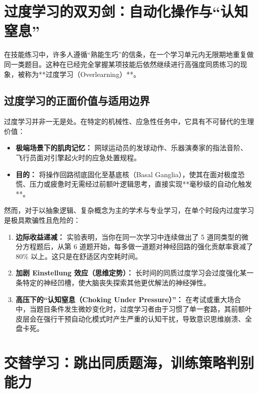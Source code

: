 \documentclass[12pt,a4paper,openany]{ctexbook}
\begin{document}
\section{过度学习的双刃剑：自动化操作与“认知窒息”}

在技能练习中，许多人遵循“熟能生巧”的信条，在一个学习单元内无限期地重复做同一类题目。这种在已经完全掌握某项技能后依然继续进行高强度同质练习的现象，被称为**过度学习（Overlearning）**。

\subsection*{过度学习的正面价值与适用边界}

过度学习并非一无是处。在特定的机械性、应急性任务中，它具有不可替代的生理价值：
\begin{itemize}
    \item \textbf{极端场景下的肌肉记忆：} 网球运动员的发球动作、乐器演奏家的指法音阶、飞行员面对引擎起火时的应急处置规程。
    \item \textbf{目的：} 将操作回路彻底固化至基底核（Basal Ganglia），使其在面对极度恐慌、压力或疲惫时无需经过前额叶逻辑思考，直接实现**毫秒级的自动化触发**。
\end{itemize}

\begin{warningbox}
然而，对于以抽象逻辑、复杂概念为主的学术与专业学习，在单个时段内过度学习是极具欺骗性且危险的：
\begin{enumerate}
    \item \textbf{边际收益递减：} 实验表明，当你在同一次学习中连续做出了 5 道同类型的微分方程题后，从第 6 道题开始，每多做一道题对神经回路的强化贡献率衰减了 80\% 以上。这只是在舒适区内空耗时间。
    \item \textbf{加剧 Einstellung 效应（思维定势）：} 长时间的同质过度学习会过度强化某一条特定的神经凹槽，使大脑丧失探索其他更优解法的神经弹性。
    \item \textbf{高压下的“认知窒息（Choking Under Pressure）”：} 
    在考试或重大场合中，当题目条件发生微妙变化时，过度学习者由于习惯了单一套路，其前额叶皮层会在强行干预自动化模式时产生严重的认知干扰，导致意识思维崩溃、全盘卡死。
\end{enumerate}
\end{warningbox}

\section{交替学习：跳出同质题海，训练策略判别能力}
\end{document}
